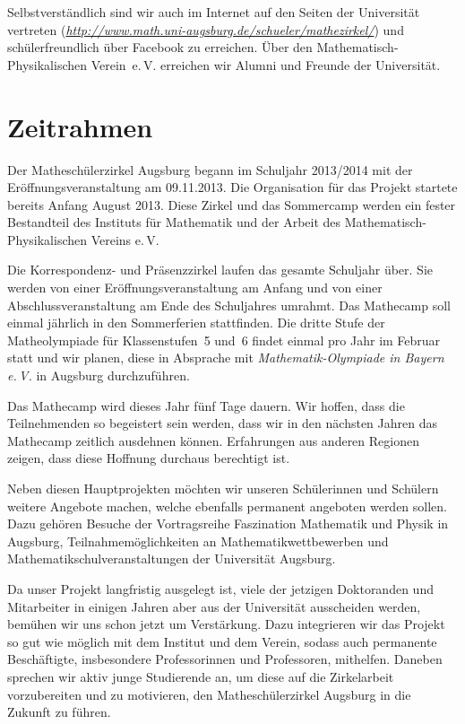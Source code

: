 \documentclass[12pt]{zettel}
\begin{document}
Selbstverständlich sind wir auch im Internet auf den Seiten der Universität
vertreten
(\href{http://www.math.uni-augsburg.de/schueler/mathezirkel/}{\textsl{http:/\!/www.math.uni-augsburg.de/schueler/mathezirkel/}})
und schülerfreundlich über Facebook zu erreichen. Über den
Mathematisch-Physikalischen Verein~e.\,V. erreichen wir Alumni und Freunde der
Universität.


\section{Zeitrahmen}

Der Matheschülerzirkel Augsburg begann im Schuljahr 2013/2014 mit der
Eröff\-nungs\-ver\-an\-stal\-tung am 09.11.2013. Die Organisation für das Projekt
startete bereits Anfang August 2013. Diese Zirkel und
das Sommercamp werden ein fester Bestandteil des Instituts für Mathematik und
der Arbeit des Mathematisch-Physikalischen Vereins e.\,V.

Die Korrespondenz- und Präsenzzirkel laufen
das gesamte Schuljahr über. Sie werden von einer
Eröffnungsveranstaltung am Anfang und von einer
Abschlussveranstaltung am Ende des Schuljahres umrahmt. Das Mathecamp soll
einmal jährlich in den Sommerferien stattfinden. Die dritte Stufe der
Matheolympiade für Klassenstufen~5 und~6 findet einmal pro Jahr
im Februar statt und wir planen, diese in
Absprache mit \emph{Mathematik-Olympiade in Bayern e.\,V.} in Augsburg
durchzuführen.

Das Mathecamp wird dieses Jahr fünf Tage dauern. Wir hoffen, dass die
Teilnehmenden so begeistert sein werden,
dass wir in den nächsten Jahren das
Mathecamp zeitlich ausdehnen können. Erfahrungen aus
anderen Regionen zeigen, dass diese Hoffnung durchaus berechtigt ist.

Neben diesen Hauptprojekten möchten wir unseren Schülerinnen und
Schülern weitere Angebote machen, welche ebenfalls permanent angeboten
werden sollen. Dazu gehören Besuche der Vortragsreihe Faszination
Mathematik und Physik in Augsburg, Teilnahmemöglichkeiten
an Mathematikwettbewerben und Mathematikschulveranstaltungen der Universität Augsburg.

Da unser Projekt langfristig ausgelegt ist, viele der jetzigen Doktoranden und
Mitarbeiter in einigen Jahren aber aus der Universität ausscheiden werden,
bemühen wir uns schon jetzt um Verstärkung.
Dazu integrieren wir das Projekt so gut wie möglich mit
dem Institut und dem Verein, sodass auch permanente Beschäftigte,
insbesondere Professorinnen und Professoren, mithelfen. Daneben sprechen wir
aktiv junge Studierende an, um diese auf die Zirkelarbeit
vorzubereiten und zu motivieren, den Matheschülerzirkel
Augsburg in die Zukunft zu führen.
\end{document}
